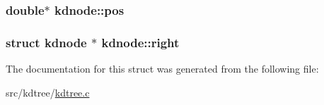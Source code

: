 \subsubsection[{pos}]{\setlength{\rightskip}{0pt plus 5cm}double$\ast$ kdnode\+::pos}\label{structkdnode_af92e7d95a2845d3e8611b289d6398a83}
\hypertarget{structkdnode_a560fdae1b98325057e95c817f76bee67}{}
\subsubsection[{right}]{\setlength{\rightskip}{0pt plus 5cm}struct {\bf kdnode} $\ast$ kdnode\+::right}\label{structkdnode_a560fdae1b98325057e95c817f76bee67}


The documentation for this struct was generated from the following file\+:\begin{DoxyCompactItemize}
\item 
src/kdtree/\hyperlink{kdtree_8c}{kdtree.\+c}\end{DoxyCompactItemize}

